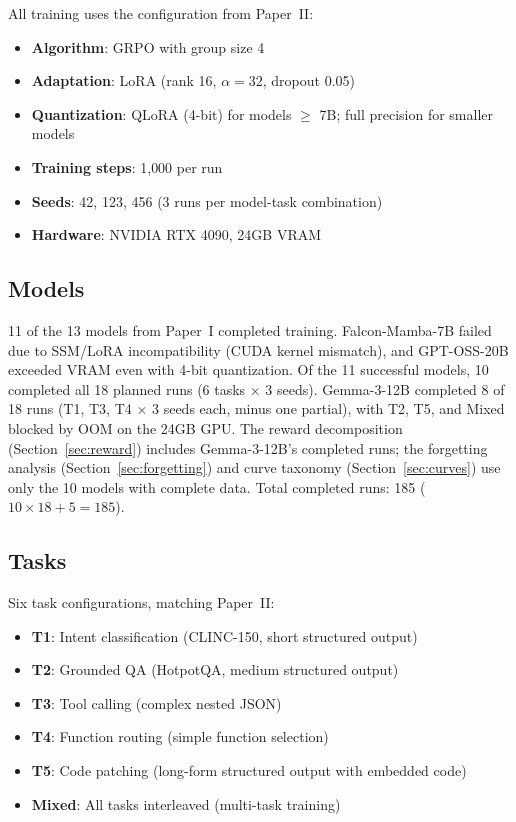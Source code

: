 \documentclass[11pt]{article}
\begin{document}
All training uses the configuration from Paper~II:
\begin{itemize}[leftmargin=*]
\item \textbf{Algorithm}: GRPO with group size 4
\item \textbf{Adaptation}: LoRA (rank 16, $\alpha = 32$, dropout 0.05)
\item \textbf{Quantization}: QLoRA (4-bit) for models $\geq$ 7B; full precision for smaller models
\item \textbf{Training steps}: 1{,}000 per run
\item \textbf{Seeds}: 42, 123, 456 (3 runs per model-task combination)
\item \textbf{Hardware}: NVIDIA RTX 4090, 24GB VRAM
\end{itemize}

\subsection{Models}

11 of the 13 models from Paper~I completed training.  Falcon-Mamba-7B failed due to SSM/LoRA incompatibility (CUDA kernel mismatch), and GPT-OSS-20B exceeded VRAM even with 4-bit quantization.  Of the 11 successful models, 10 completed all 18 planned runs (6 tasks $\times$ 3 seeds).  Gemma-3-12B completed 8 of 18 runs (T1, T3, T4 $\times$ 3 seeds each, minus one partial), with T2, T5, and Mixed blocked by OOM on the 24GB GPU.  The reward decomposition (Section~\ref{sec:reward}) includes Gemma-3-12B's completed runs; the forgetting analysis (Section~\ref{sec:forgetting}) and curve taxonomy (Section~\ref{sec:curves}) use only the 10 models with complete data.  Total completed runs: 185 ($10 \times 18 + 5 = 185$).

\subsection{Tasks}

Six task configurations, matching Paper~II:
\begin{itemize}[leftmargin=*]
\item \textbf{T1}: Intent classification (CLINC-150, short structured output)
\item \textbf{T2}: Grounded QA (HotpotQA, medium structured output)
\item \textbf{T3}: Tool calling (complex nested JSON)
\item \textbf{T4}: Function routing (simple function selection)
\item \textbf{T5}: Code patching (long-form structured output with embedded code)
\item \textbf{Mixed}: All tasks interleaved (multi-task training)
\end{itemize}
\end{document}
